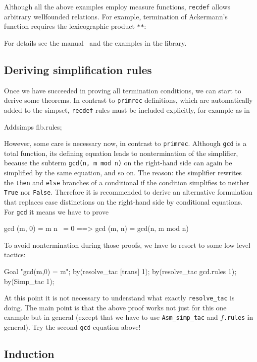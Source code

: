 Although all the above examples employ measure functions, \texttt{recdef}
allows arbitrary wellfounded relations. For example, termination of
Ackermann's function requires the lexicographic product \texttt{**}:
\begin{ttbox}
\end{ttbox}
For details see the manual~\cite{isabelle-HOL} and the examples in the
library.


\subsection{Deriving simplification rules}

Once we have succeeded in proving all termination conditions, we can start to
derive some theorems. In contrast to \texttt{primrec} definitions, which are
automatically added to the simpset, \texttt{recdef} rules must be included
explicitly, for example as in
\begin{ttbox}
Addsimps fib.rules;
\end{ttbox}
However, some care is necessary now, in contrast to \texttt{primrec}.
Although \texttt{gcd} is a total function, its defining equation leads to
nontermination of the simplifier, because the subterm \texttt{gcd(n, m mod
  n)} on the right-hand side can again be simplified by the same equation,
and so on. The reason: the simplifier rewrites the \texttt{then} and
\texttt{else} branches of a conditional if the condition simplifies to
neither \texttt{True} nor \texttt{False}.  Therefore it is recommended to
derive an alternative formulation that replaces case distinctions on the
right-hand side by conditional equations. For \texttt{gcd} it means we have
to prove
\begin{ttbox}
           gcd (m, 0) = m
n ~= 0 ==> gcd (m, n) = gcd(n, m mod n)
\end{ttbox}
To avoid nontermination during those proofs, we have to resort to some low
level tactics:
\begin{ttbox}
Goal "gcd(m,0) = m";
by(resolve_tac [trans] 1);
by(resolve_tac gcd.rules 1);
by(Simp_tac 1);
\end{ttbox}
At this point it is not necessary to understand what exactly
\texttt{resolve_tac} is doing. The main point is that the above proof works
not just for this one example but in general (except that we have to use
\texttt{Asm_simp_tac} and $f$\texttt{.rules} in general). Try the second
\texttt{gcd}-equation above!

\subsection{Induction}

